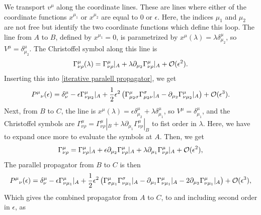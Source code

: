 We transport $v^\mu$ along the coordinate lines.
These are lines where either of the coordinate functions $x^{\mu_1}$ or $x^{\mu_2}$ are equal to $0$ or $\epsilon$.
Here, the indices $\mu_1$ and $\mu_2$ are not free but identify the two coordinate functions which define this loop.
The line from $A$ to $B$, defined by $x^{\mu_1} = 0$, is parametrized by $x^\mu(\lambda) = \lambda \delta^\mu_{\mu_2}$, so $ V^\mu = \delta^\mu_{\mu_2} $.
The Christoffel symbol along this line is
%
\begin{equation}
    \Gamma^{\mu}_{\nu \rho}(\lambda) 
    = \Gamma^{\mu}_{\nu \rho}|_A
    + \lambda \partial_{\mu_2} \Gamma^{\mu}_{\nu \rho}|_A + \mathcal O(\epsilon^2).
\end{equation}
%
Inserting this into \autoref{iterative paralell propagator}, we get
%
\begin{equation}
    P^\mu{}_\nu(\epsilon)
    = \delta^\mu_\nu 
    - \epsilon \Gamma^{\mu}_{\nu \mu_2}|_A
    + \frac{1}{2} \epsilon^2 
    \left(
        \Gamma^\mu_{\mu_2 \sigma}\Gamma^\sigma_{\mu_2 \nu} |_A 
        -\partial_{\mu_2} \Gamma^{\mu}_{\nu \mu_2}|_A 
    \right)
    + \mathcal O(\epsilon^3).
\end{equation}
%
Next, from $B$ to $C$, the line is $x^\mu(\lambda) = \epsilon \delta^\mu_{\mu_2} + \lambda \delta^{\mu}_{\mu_1}$, so $V^\mu = \delta^\mu_{\mu_1}$, and the Christoffel symbols are 
$ 
\Gamma^{\mu}_{\nu\rho}
= 
\Gamma^{\mu}_{\nu \rho}|_B
+ \lambda \partial_{\mu_1} \Gamma^{\mu}_{\nu \rho}|_B
$
to fist order in $\lambda$.
Here, we have to expand once more to evaluate the symbols at $A$.
Then, we get
%
\begin{equation}
    \Gamma^{\mu}_{\nu\rho}
    =
    \Gamma^{\mu}_{\nu \rho}|_A + \epsilon \partial_{\mu_2} \Gamma^{\mu}_{\nu \rho}|_A
    + \lambda \partial_{\mu_1} \Gamma^{\mu}_{\nu \rho}|_A + \mathcal O(\epsilon^2),
\end{equation}
%
The parallel propagator from $B$ to $C$ is then
%
\begin{equation}
    P^{\mu}{}_\nu(\epsilon)
    = 
    \delta^\mu_\nu
    - \epsilon \Gamma^{\mu}_{\nu \mu_1}|_A 
    + \frac{1}{2}\epsilon^2
    \left(
        \Gamma^\mu_{\sigma \mu_1}\Gamma^\sigma_{\nu \mu_1}|_A
        - \partial_{\mu_1} \Gamma^{\mu}_{\nu \mu_1}|_A
        - 2 \partial_{\mu_2} \Gamma^{\mu}_{\nu \mu_1}|_A
    \right)
    + \mathcal O(\epsilon^3),
\end{equation}
%
Which gives the combined propagator from $A$ to $C$, to and including second order in $\epsilon$, as
%
